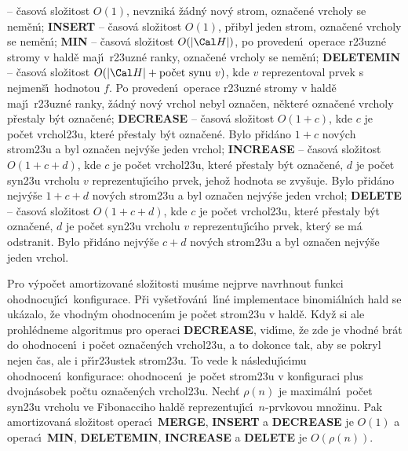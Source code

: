 \documentclass[a4paper,12pt]{article}
\begin{document}
 -- \v casov\'a slo\v zitost $O(1)$, nevznik\'a \v z\'adn\'y 
nov\'y strom, 
ozna\-\v ce\-n\'e vrcholy se nem\v en\'\i ;\newline 
{\bf INSERT} -- \v casov\'a slo\v zitost $O(1)$, p\v ribyl jeden strom, 
ozna\v cen\'e vrcholy se nem\v en\'\i ;\newline 
{\bf MIN} -- \v casov\'a slo\v zitost $O(|\Cal H|)$, po proveden\'\i\ operace 
r\accent23uzn\'e stro\-my v hald\v e maj\'\i\ r\accent23uzn\'e 
ranky, ozna\v cen\'e vrcholy se nem\v en\'\i ;\newline 
{\bf DELETEMIN} -- \v casov\'a slo\v zitost $O(|\Cal H|+\text{\rm po\v cet syn\accent23u }
v)$,
kde $v$ reprezentoval prvek s nej\-men\v s\'\i\ hodnotou $f$. Po 
proveden\'\i\ ope\-ra\-ce r\accent23uzn\'e stromy v hald\v e maj\'\i\ 
r\accent23uzn\'e ranky, \v z\'adn\'y nov\'y vrchol nebyl 
ozna\v cen, n\v ekter\'e ozna\v cen\'e vrcholy p\v restaly b\'yt ozna\v cen\'e;\newline 
{\bf DECREASE} -- \v casov\'a slo\v zitost $O(1+c)$, kde $c$ je po\v cet 
vrchol\accent23u, kter\'e p\v restaly b\'yt ozna\v cen\'e. 
Bylo p\v rid\'ano $1+c$ nov\'ych strom\accent23u a byl ozna\v cen 
nejv\'y\v se jeden vrchol;\newline 
{\bf INCREASE} -- \v casov\'a slo\v zitost $O(1+c+d)$, kde $c$ je po\v cet 
vrchol\accent23u, kter\'e p\v restaly b\'yt ozna\v cen\'e, $d$ je 
po\v cet syn\accent23u vrcholu $v$ reprezentuj\'\i c\'\i ho prvek, 
jeho\v z hodnota se zvy\v suje. Bylo p\v rid\'ano nejv\'y\v se $1
+c+d$ 
nov\'ych strom\accent23u a byl ozna\v cen nejv\'y\v se jeden 
vrchol;\newline 
{\bf DELETE} -- \v casov\'a slo\v zitost $O(1+c+d)$, kde $c$ je po\v cet 
vrchol\accent23u, kter\'e p\v restaly b\'yt ozna\v cen\'e, $d$ je 
po\v cet syn\accent23u vrcholu $v$ reprezentuj\'\i c\'\i ho prvek, 
kter\'y se m\'a odstranit. Bylo p\v rid\'ano nejv\'y\v se $c+d$ 
nov\'ych strom\accent23u a byl ozna\v cen nejv\'y\v se jeden 
vrchol.
\medskip

\flushpar Pro v\'ypo\v cet amortizovan\'e slo\v zitosti 
mus\'\i me nejprve navrhnout funkci ohodnocuj\'\i c\'\i\ 
konfigurace.  P\v ri vy\v set\v rov\'an\'\i\ l\'\i n\'e implementace binomi\'aln\'\i ch 
hald se uk\'azalo, \v ze vhodn\'ym ohodnocen\'\i m je po\v cet strom\accent23u 
v hald\v e. Kdy\v z si ale prohl\'edneme algoritmus pro operaci 
{\bf DECREASE}, vid\'\i me, \v ze zde je vhodn\'e br\'at do ohodnocen\'\i\ i 
po\v cet ozna\v cen\'ych vrchol\accent23u, a to dokonce tak, aby 
se pokryl 
nejen \v cas, ale i p\v r\'\i r\accent23ustek strom\accent23u. To vede k 
n\'asleduj\'\i c\'\i mu ohodnocen\'\i\ konfigurace: ohodnocen\'\i\ je po\v cet 
strom\accent23u v konfiguraci plus dvojn\'asobek po\v ctu 
ozna\v cen\'ych vrchol\accent23u.
\medskip
\flushpar Nech\v t $\rho (n)$ je maxim\'aln\'\i\ 
po\v cet syn\accent23u vrcholu ve Fibonacciho hald\v e 
reprezentuj\'\i c\'\i\ $n$-prvkovou mno\v zinu.  Pak amortizovan\'a 
slo\v zitost operac\'\i\ {\bf MERGE}, {\bf INSERT} a {\bf DECREASE} je $
O(1)$ a 
operac\'\i\ {\bf MIN}, {\bf DELETEMIN}, {\bf INCREASE} a {\bf DELETE} je $
O(\rho (n))$.
\medskip
\end{document}
